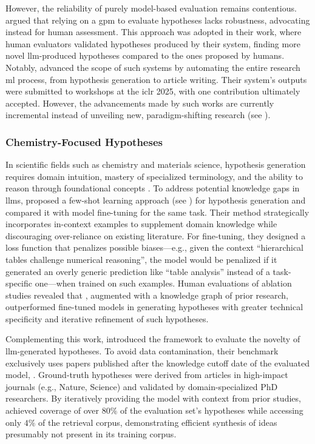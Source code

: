 However, the reliability of purely model-based evaluation remains contentious. 
\textcite{si2025llms} argued that relying on a \gls{gpm} to evaluate hypotheses lacks robustness, advocating instead for human assessment. 
This approach was adopted in their work, where human evaluators validated hypotheses produced by their system, finding more novel \gls{llm}-produced hypotheses compared to the ones proposed by humans.
Notably, \textcite{yamada2025ai} advanced the scope of such systems by automating the entire research \gls{ml} process, from hypothesis generation to article writing. 
Their system’s outputs were submitted to workshops at the \gls{iclr} 2025, with one contribution ultimately accepted. However, the advancements made by such works are currently incremental instead of unveiling new, paradigm-shifting  research (see ).

\subsubsection{Chemistry-Focused Hypotheses}

In scientific fields such as chemistry and materials science, hypothesis generation requires domain intuition, mastery of specialized terminology, and the ability to reason through foundational concepts \autocite{miret2024llms}. 
To address potential knowledge gaps in \glspl{llm}, \textcite{wang2023scimon0} proposed a few-shot learning approach (see ) for hypothesis generation and compared it with model fine-tuning for the same task. 
Their method strategically incorporates in-context examples to supplement domain knowledge while discouraging over-reliance on existing literature. 
For fine-tuning, they designed a loss function that penalizes possible biases---e.g., given the context \enquote{hierarchical tables challenge numerical reasoning}, the model would be penalized if it generated an overly generic prediction like \enquote{table analysis} instead of a task-specific one---when trained on such examples. 
Human evaluations of ablation studies revealed that , augmented with a knowledge graph of prior research, outperformed fine-tuned models in generating hypotheses with greater technical specificity and iterative refinement of such hypotheses.

Complementing this work, \textcite{yang2025moose} introduced the  framework to evaluate the novelty of \gls{llm}-generated hypotheses. 
To avoid data contamination, their benchmark exclusively uses papers published after the knowledge cutoff date of the evaluated model, . 
Ground-truth hypotheses were derived from articles in high-impact journals (e.g., Nature, Science) and validated by domain-specialized PhD researchers.
By iteratively providing the model with context from prior studies,  achieved coverage of over $80\%$ of the evaluation set’s hypotheses while accessing only $4\%$ of the retrieval corpus, demonstrating efficient synthesis of ideas presumably not present in its training corpus.

